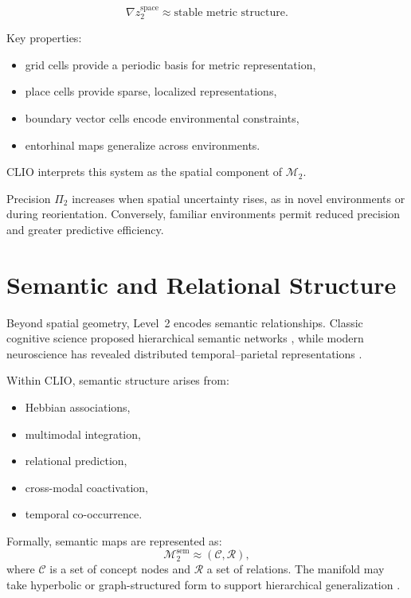 \documentclass[12pt,oneside]{book}
\theoremstyle{plain}
\theoremstyle{definition}
\let\citep\parencite
\begin{document}
\[
\nabla z_2^\text{space} \approx \text{stable metric structure}.
\]

Key properties:

\begin{itemize}
  \item grid cells provide a periodic basis for metric representation,
  \item place cells provide sparse, localized representations,
  \item boundary vector cells encode environmental constraints,
  \item entorhinal maps generalize across environments.
\end{itemize}

CLIO interprets this system as the spatial component of $\mathcal{M}_2$.

Precision $\Pi_{2}$ increases when spatial uncertainty rises, as in novel
environments or during reorientation.
Conversely, familiar environments permit reduced precision and greater
predictive efficiency.

\section{Semantic and Relational Structure}

Beyond spatial geometry, Level~2 encodes semantic relationships.
Classic cognitive science proposed hierarchical semantic networks
\citep{collins1969retrieval}, while modern neuroscience has revealed
distributed temporal–parietal representations
\citep{lambon2007semantic}.

Within CLIO, semantic structure arises from:

\begin{itemize}
  \item Hebbian associations,
  \item multimodal integration,
  \item relational prediction,
  \item cross-modal coactivation,
  \item temporal co-occurrence.
\end{itemize}

Formally, semantic maps are represented as:
\[
\mathcal{M}_2^\text{sem} \approx
(\mathcal{C}, \mathcal{R}),
\]
where $\mathcal{C}$ is a set of concept nodes and $\mathcal{R}$ a set of
relations.
The manifold may take hyperbolic or graph-structured form to support
hierarchical generalization \citep{sala2020representation}.
\end{document}

